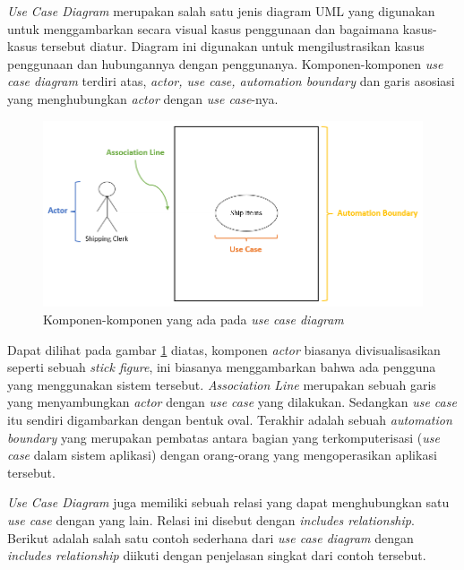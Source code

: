\documentclass[a4paper]{article}
\begin{document}
\begin{enumerate}
    \textit{Use Case Diagram} merupakan salah satu jenis diagram UML yang digunakan untuk menggambarkan secara visual kasus penggunaan dan bagaimana kasus-kasus tersebut diatur. Diagram ini digunakan untuk mengilustrasikan kasus penggunaan dan hubungannya dengan penggunanya. Komponen-komponen \textit{use case diagram} terdiri atas, \textit{actor, use case, automation boundary} dan garis asosiasi yang menghubungkan \textit{actor} dengan \textit{use case}-nya\autocite[81-87]{uml-satzinger}.

    \begin{figure}[h]
        \centering
        \includegraphics[scale=0.5]{images/uml satzinger/use case diagram/Komponen use case diagram.png}
        \caption{Komponen-komponen yang ada pada \textit{use case diagram}}
        \label{fig:usecasenotation}
    \end{figure}

    Dapat dilihat pada gambar \ref{fig:usecasenotation} diatas, komponen \textit{actor} biasanya divisualisasikan seperti sebuah \textit{stick figure}, ini biasanya menggambarkan bahwa ada pengguna yang menggunakan sistem tersebut. \textit{Association Line} merupakan sebuah garis yang menyambungkan \textit{actor} dengan \textit{use case} yang dilakukan. Sedangkan \textit{use case} itu sendiri digambarkan dengan bentuk oval. Terakhir adalah sebuah \textit{automation boundary} yang merupakan pembatas antara bagian yang terkomputerisasi (\textit{use case} dalam sistem aplikasi) dengan orang-orang yang mengoperasikan aplikasi tersebut\autocite[81-87]{uml-satzinger}.

    \textit{Use Case Diagram} juga memiliki sebuah relasi yang dapat menghubungkan satu \textit{use case} dengan yang lain. Relasi ini disebut dengan \textit{includes relationship}. Berikut adalah salah satu contoh sederhana dari \textit{use case diagram} dengan \textit{includes relationship} diikuti dengan penjelasan singkat dari contoh tersebut\autocite[81-87]{uml-satzinger}.


\end{enumerate}
\end{document}

